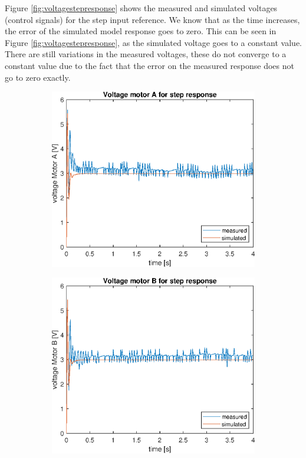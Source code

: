 \documentclass[a4paper,kul]{kulakarticle} %
\begin{document}
Figure \ref{fig:voltagestepresponse} shows the measured and simulated voltages (control signals) for the step input reference. We know that as the time increases, the error of the simulated model response goes to zero. This can be seen in Figure \ref{fig:voltagestepresponse}, as the simulated voltage goes to a constant value. There are still variations in the measured voltages, these do not converge to a constant value due to the fact that the error on the measured response does not go to zero exactly.
\begin{figure}[htp!]
	\centering
	\begin{subfigure}[b]{0.49\textwidth}
		\centering
		\includegraphics[width=\linewidth]{comparison_voltage_stepresponseA.eps}
		
	\end{subfigure}
	\hfill
	\begin{subfigure}[b]{0.49\textwidth}  
		\centering
		\includegraphics[width=\linewidth]{comparison_voltage_stepresponseB.eps}
		

\end{subfigure}
\end{figure}
\end{document}

